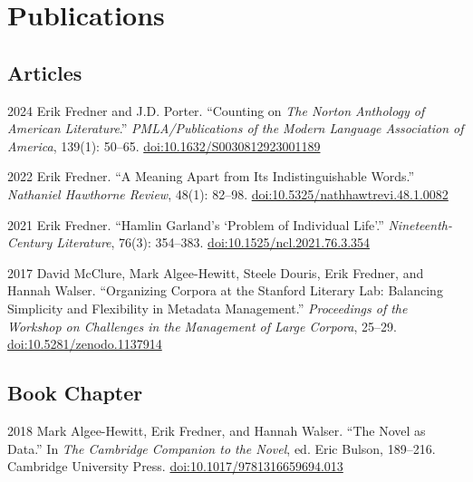 \documentclass[12pt,letterpaper]{report}
\begin{document}
\section*{Publications}

\subsection*{Articles}

\begin{tablist}
	\item[2024] \tab{}Erik Fredner and J.D. Porter. \enquote{Counting on \textit{The Norton Anthology of American Literature}.} \textit{PMLA/Publications of the Modern Language Association of America}, 139(1): 50--65. \href{https://doi.org/10.1632/S0030812923001189}{doi:10.1632/S0030812923001189}
	\item[2022] \tab{}Erik Fredner. \enquote{A Meaning Apart from Its Indistinguishable Words.} \textit{Nathaniel Hawthorne Review}, 48(1): 82--98. \href{https://doi.org/10.5325/nathhawtrevi.48.1.0082}{doi:10.5325/nathhawtrevi.48.1.0082}
	\item[2021] \tab{}Erik Fredner. \enquote{Hamlin Garland's ‘Problem of Individual Life’.} \textit{Nineteenth-Century Literature}, 76(3): 354--383. \href{https://doi.org/10.1525/ncl.2021.76.3.354}{doi:10.1525/ncl.2021.76.3.354}
	\item[2017] \tab{}David McClure, Mark Algee-Hewitt, Steele Douris, Erik Fredner, and Hannah Walser. \enquote{Organizing Corpora at the Stanford Literary Lab: Balancing Simplicity and Flexibility in Metadata Management.} \textit{Proceedings of the Workshop on Challenges in the Management of Large Corpora}, 25--29. \href{https://ids-pub.bsz-bw.de/frontdoor/index/index/docId/6261}{doi:10.5281/zenodo.1137914}
\end{tablist}

\subsection*{Book Chapter}

\begin{tablist}
	\item[2018] \tab{}Mark Algee-Hewitt, Erik Fredner, and Hannah Walser. \enquote{The Novel as Data.} In \textit{The Cambridge Companion to the Novel}, ed. Eric Bulson, 189--216. Cambridge University Press. \href{https://doi.org/10.1017/9781316659694.013}{doi:10.1017/9781316659694.013}
\end{tablist}
\end{document}
